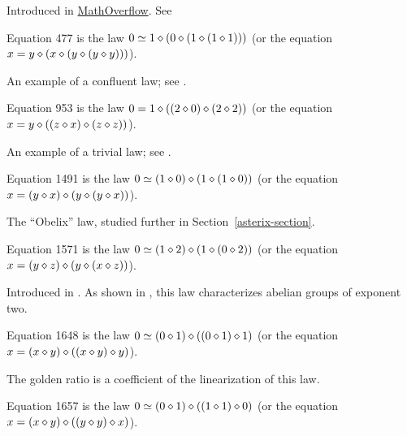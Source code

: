 Introduced in \href{https://mathoverflow.net/a/450905/766}{MathOverflow}. See 

\begin{definition}[Equation 477]\label{eq477}\leanok{}  Equation 477 is the law $0 \simeq 1 \diamond (0 \diamond (1 \diamond (1 \diamond 1)))$ (or the equation $x = y \diamond (x \diamond (y \diamond (y \diamond y)))$).
\end{definition}

An example of a confluent law; see .

\begin{definition}[Equation 953]\label{eq953}\leanok{}  Equation 953 is the law $0 = 1 \diamond ((2 \diamond 0) \diamond (2 \diamond 2))$ (or the equation $x = y \diamond ((z \diamond x) \diamond (z \diamond z))$).
\end{definition}

An example of a trivial law; see .

\begin{definition}[Equation 1491]\label{eq1491}\leanok{}  Equation 1491 is the law $0 \simeq  (1 \diamond 0) \diamond (1 \diamond (1 \diamond 0))$ (or the equation $x = (y \diamond x) \diamond (y \diamond (y \diamond x))$).
\end{definition}

The ``Obelix'' law, studied further in Section~\ref{asterix-section}.

\begin{definition}[Equation 1571]\label{eq1571}\leanok{}  Equation 1571 is the law $0 \simeq  (1 \diamond 2) \diamond (1 \diamond (0 \diamond 2))$ (or the equation $x = (y \diamond z) \diamond (y \diamond (x \diamond z))$).
\end{definition}

Introduced in \cite{mendelsohn-padmanabhan}.  As shown in , this law characterizes abelian groups of exponent two.

\begin{definition}[Equation 1648]\label{eq1648}\leanok{}  Equation 1648 is the law $0 \simeq  (0 \diamond 1) \diamond ((0 \diamond 1) \diamond 1)$ (or the equation $x = (x \diamond y) \diamond ((x \diamond y) \diamond y)$).
\end{definition}

The golden ratio is a coefficient of the linearization of this law.

\begin{definition}[Equation 1657]\label{eq1657}\leanok{}  Equation 1657 is the law $0 \simeq  (0 \diamond 1) \diamond ((1 \diamond 1) \diamond 0)$ (or the equation $x = (x \diamond y) \diamond ((y \diamond y) \diamond x)$).
\end{definition}

